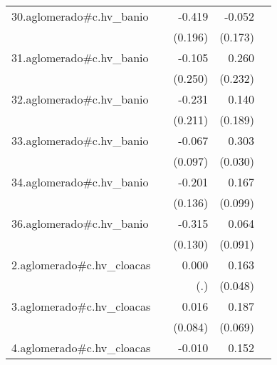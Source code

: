 {\begin{longtable}{l*{4}{D{.}{.}{-1}}}
\addlinespace
30.aglomerado#c.hv\_banio&                     &      -0.419\sym{*}  &      -0.052         &                     \\
            &                     &     (0.196)         &     (0.173)         &                     \\
\addlinespace
31.aglomerado#c.hv\_banio&                     &      -0.105         &       0.260         &                     \\
            &                     &     (0.250)         &     (0.232)         &                     \\
\addlinespace
32.aglomerado#c.hv\_banio&                     &      -0.231         &       0.140         &                     \\
            &                     &     (0.211)         &     (0.189)         &                     \\
\addlinespace
33.aglomerado#c.hv\_banio&                     &      -0.067         &       0.303\sym{***}&                     \\
            &                     &     (0.097)         &     (0.030)         &                     \\
\addlinespace
34.aglomerado#c.hv\_banio&                     &      -0.201         &       0.167         &                     \\
            &                     &     (0.136)         &     (0.099)         &                     \\
\addlinespace
36.aglomerado#c.hv\_banio&                     &      -0.315\sym{*}  &       0.064         &                     \\
            &                     &     (0.130)         &     (0.091)         &                     \\
\addlinespace
2.aglomerado#c.hv\_cloacas&                     &       0.000         &       0.163\sym{***}&                     \\
            &                     &         (.)         &     (0.048)         &                     \\
\addlinespace
3.aglomerado#c.hv\_cloacas&                     &       0.016         &       0.187\sym{**} &                     \\
            &                     &     (0.084)         &     (0.069)         &                     \\
\addlinespace
4.aglomerado#c.hv\_cloacas&                     &      -0.010         &       0.152\sym{***}&                     \\

\end{longtable}}
